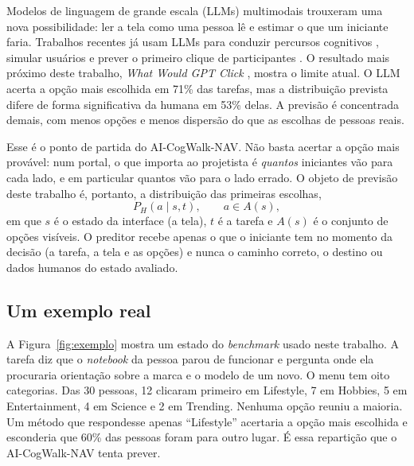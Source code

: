 \documentclass[12pt,oneside,a4paper,chapter=TITLE,english,brazil]{abntex2}
\newcommand{\proj}{AI-CogWalk-NAV}
\newcommand{\Ph}{P_H}
\begin{document}
Modelos de linguagem de grande escala (LLMs) multimodais trouxeram uma nova possibilidade: ler a tela como uma pessoa lê e estimar o que um iniciante faria. Trabalhos recentes já usam LLMs para conduzir percursos cognitivos \cite{bisante2024cwgpt,zhong2025syntheticcw}, simular usuários \cite{lu2025uxagent,tan2026avenirux,chowdhury2026amuser} e prever o primeiro clique de participantes \cite{kuric2026wwgc,hu2025uitransition}. O resultado mais próximo deste trabalho, \textit{What Would GPT Click} \cite{kuric2026wwgc}, mostra o limite atual. O LLM acerta a opção mais escolhida em 71\% das tarefas, mas a distribuição prevista difere de forma significativa da humana em 53\% delas. A previsão é concentrada demais, com menos opções e menos dispersão do que as escolhas de pessoas reais.

Esse é o ponto de partida do \proj. Não basta acertar a opção mais provável: num portal, o que importa ao projetista é \emph{quantos} iniciantes vão para cada lado, e em particular quantos vão para o lado errado. O objeto de previsão deste trabalho é, portanto, a distribuição das primeiras escolhas,
\begin{equation}
\Ph(a \mid s, t), \qquad a \in A(s),
\end{equation}
em que $s$ é o estado da interface (a tela), $t$ é a tarefa e $A(s)$ é o conjunto de opções visíveis. O preditor recebe apenas o que o iniciante tem no momento da decisão (a tarefa, a tela e as opções) e nunca o caminho correto, o destino ou dados humanos do estado avaliado.

\subsection{Um exemplo real}

A Figura~\ref{fig:exemplo} mostra um estado do \textit{benchmark} usado neste trabalho. A tarefa diz que o \textit{notebook} da pessoa parou de funcionar e pergunta onde ela procuraria orientação sobre a marca e o modelo de um novo. O menu tem oito categorias. Das 30 pessoas, 12 clicaram primeiro em Lifestyle, 7 em Hobbies, 5 em Entertainment, 4 em Science e 2 em Trending. Nenhuma opção reuniu a maioria. Um método que respondesse apenas ``Lifestyle'' acertaria a opção mais escolhida e esconderia que 60\% das pessoas foram para outro lugar. É essa repartição que o \proj{} tenta prever.
\end{document}
